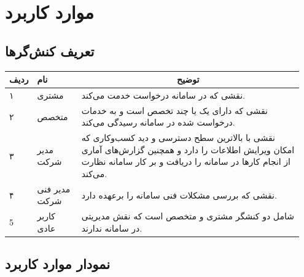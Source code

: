 
\chapter{موارد کاربرد}


\section{تعریف کنش‌گر‌ها}


\begin{table}[h]
	\setlength\extrarowheight{-5pt}
	\centering
	\begin{tabular}{|p{0.05\linewidth}|p{0.15\linewidth}|p{0.75\linewidth}|} 
\hline
\multicolumn{1}{|c|}{\textbf{ردیف}} & \textbf{نام}  & \multicolumn{1}{c|}{\textbf{توضیح}}                                                                                                                                  \\ \hline
۱                                   & مشتری         & نقشی که در سامانه درخواست خدمت می‌کند.                                                                                                                               \\ \hline
۲                                   & متخصص         & نقشی که دارای یک یا چند تخصص است و به خدمات درخواست شده در سامانه رسیدگی می‌کند.                                                                                     \\ \hline
۳                                   & مدیر شرکت     & نقشی با بالاترین سطح دسترسی و دید کسب‌و‌کاری که امکان ویرایش اطلاعات را دارد و همچنین گزارش‌های آماری از انجام کارها در سامانه را دریافت و بر کار سامانه نظارت می‌کند. \\ \hline
۴                                   & مدیر فنی شرکت & نقشی که بررسی مشکلات فنی سامانه را برعهده دارد.  
 \\ \hline
 
 5                                  & کاربر عادی         & شامل دو کنشگر مشتری و متخصص است که نقش مدیریتی در سامانه ندارند.\\ \hline
	\end{tabular}
\end{table}
\newpage
\section{نمودار موارد کاربرد}


